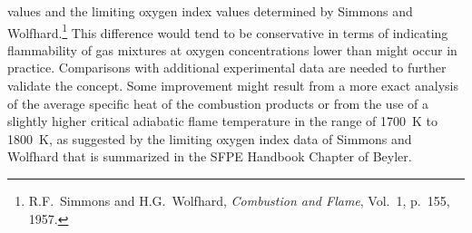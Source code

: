\documentclass[11pt]{book}
\begin{document}
values and the limiting oxygen index values determined by Simmons and Wolfhard.\footnote{R.F.~Simmons and H.G.~Wolfhard, {\em Combustion and Flame}, Vol.~1, p.~155, 1957.}
This difference would tend to be conservative in terms of indicating flammability of gas mixtures at
oxygen concentrations lower than might occur in practice.
Comparisons with additional
experimental data are needed to further validate the concept.  Some improvement might result
from a more exact analysis of the average specific heat of the combustion products or from the
use of a slightly higher critical adiabatic flame temperature in the range of 1700~K to 1800~K,
as suggested by the limiting oxygen index data of Simmons and Wolfhard that is
summarized in the SFPE Handbook Chapter of Beyler.
\end{document}
